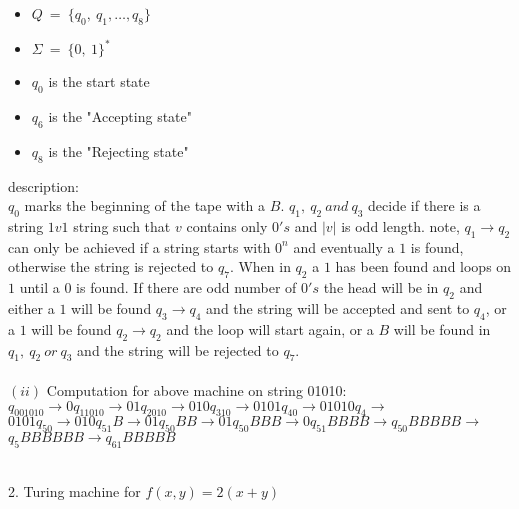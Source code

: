 \documentclass[a4paper,12pt]{article}
\begin{document}
\begin{itemize}
	\item $Q \: = \: \{ q_0, \: q_1, \dots , q_8 \}$ 
	\item $\Sigma \: = \: \{0,\: 1 \}^*$ 
	\item $q_0$ is the start state
	\item $q_6$ is the "Accepting state"
	\item $q_8$ is the "Rejecting state" 
\end{itemize}
description: \\
$q_0$ marks the beginning of the tape with a $B$. $q_1, \: q_2 \: and \: q_3$ decide if there is a string $1v1$ string such that $v$ contains only $0's$ and $|v|$ is odd length. note, $q_1 \to q_2$ can only be achieved if a string starts with $0^n$ and eventually a $1$ is found, otherwise the string is rejected to $q_7$. When in $q_2$ a $1$ has been found and loops on $1$ until a $0$ is found. If there are odd number of $0's$ the head will be in $q_2$ and either a $1$ will be found $q_3 \to q_4$ and the string will be accepted and sent to $q_4$, or a $1$ will be found $q_2 \to q_2$ and the loop will start again, or a $B$ will be found in $q_1, \: q_2 \: or \: q_3$ and the string will be rejected to $q_7$. 
\\
\\
$(ii)$ Computation for above machine on string 01010: \\
$q_001010 \to 0q_11010 \to 01q_2010 \to 010q_310 \to 0101q_40 \to 01010q_4 \to$ \\
$0101q_50 \to 010q_51B \to 01q_50BB \to 01q_50BBB \to 0q_51BBBB \to q_50BBBBB \to$ 
$q_5BBBBBB \to q_61BBBBB$
\\ \\

\newpage

2. Turing machine for $f(x,y) = 2(x+y)$
\end{document}
